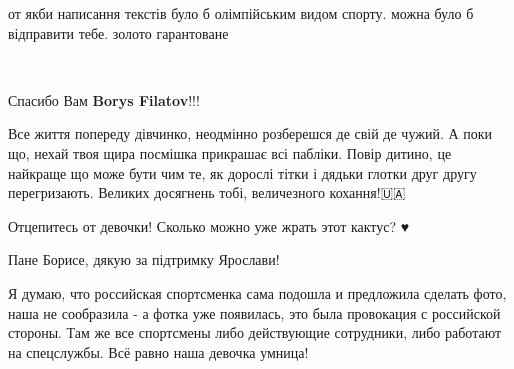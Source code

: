 \begin{itemize}
от якби написання текстів було б олімпійським видом спорту. можна було б
відправити тебе. золото гарантоване

 

👏👏👏✅

 
Спасибо Вам \textbf{Borys Filatov}!!!

 

Все життя попереду дівчинко, неодмінно розберешся де свій де чужий. А поки що,
нехай твоя щира посмішка прикрашає всі пабліки. Повір дитино, це найкраще що
може бути чим те, як дорослі тітки і дядьки глотки друг другу перегризають.
Великих досягнень тобі, величезного кохання!🇺🇦

 

Отцепитесь от девочки! Сколько можно уже жрать этот кактус? ♥️

 
Пане Борисе, дякую за підтримку Ярослави!

 

Я думаю, что российская спортсменка сама подошла и предложила сделать фото,
наша не сообразила - а фотка уже появилась, это была провокация с российской
стороны. Там же все спортсмены либо действующие сотрудники, либо работают на
спецслужбы. Всё равно наша девочка умница!


\end{itemize}
